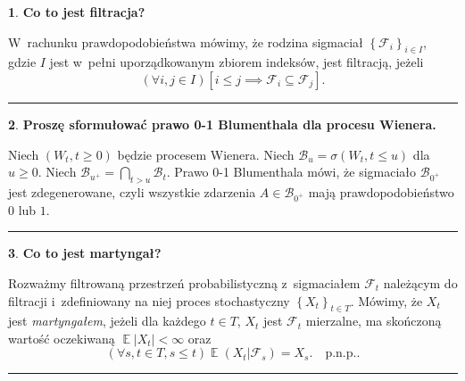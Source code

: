 \documentclass[
    twocolumn,
    twoside,
    fontsize=11pt,
    paper=A0,
    DIV=30
]{scrartcl}
\theoremstyle{definition}
\newtheorem{pytanie}{}
\theoremstyle{break}
\newenvironment{odpowiedź}{\vspace{-0.7em}}{\vspace{0.3em}\hrule}
\DeclareMathOperator {\expVal} {\mathbb{E}}
\begin{document}
\begin{pytanie}
\textbf{Co to jest filtracja?}
\end{pytanie}
\begin{odpowiedź}
    W rachunku prawdopodobieństwa mówimy, że rodzina sigma\dywiz ciał \(
    \left\{ \mathcal F_i \right\}_{i \in I} \), gdzie \( I \) jest w pełni
    uporządkowanym zbiorem indeksów, jest filtracją, jeżeli
    \begin {equation*}
        \left(\forall i, j \in I \right) \left[ i \leqslant j
            \implies \mathcal F_i \subseteq \mathcal F_j\right].
    \end {equation*}
\end{odpowiedź}
\pagebreak

\begin{pytanie}
\textbf{Proszę sformułować prawo 0-1 Blumenthala dla procesu Wienera.}
\end{pytanie}
\begin{odpowiedź}
    Niech $(W_t, t\geq 0)$ będzie procesem Wienera. Niech
    $\mathcal{B}_u = \sigma(W_t, t\leq u)$ dla $u \geq 0$.
    Niech $\mathcal{B}_{u^+} = \bigcap_{t > u} \mathcal{B}_t$.
    Prawo 0-1 Blumenthala mówi, że sigma\dywiz ciało $ \mathcal{B}_{0^+}$
    jest zdegenerowane, czyli wszystkie zdarzenia $A \in \mathcal{B}_{0^+}$
    mają prawdopodobieństwo $0$ lub $1$.
\end{odpowiedź}


\begin{pytanie}
\textbf{Co to jest martyngał?}
\end{pytanie}
\begin{odpowiedź} \label {def-martyngału}
    Rozważmy filtrowaną przestrzeń probabilistyczną z sigma\dywiz ciałem \(
    \mathcal F_t \) należącym do filtracji i zdefiniowany na niej proces
    stochastyczny \( \left\{ X_t \right\}_{t \in T} \). Mówimy, że \( X_t
    \) jest \textit {martyngałem}, jeżeli dla każdego \( t \in T \), \( X_t
    \) jest \( \mathcal F_t \) mierzalne, ma skończoną wartość oczekiwaną
    \( \expVal |X_t| < \infty \) oraz
    \begin {equation*}
        \left(\forall s, t \in T, s \leq t \right) \expVal (X_t | \mathcal F_s) = X_s.
        \quad \text{p.n.p.}.
    \end {equation*}
\end{odpowiedź}
\end{document}
